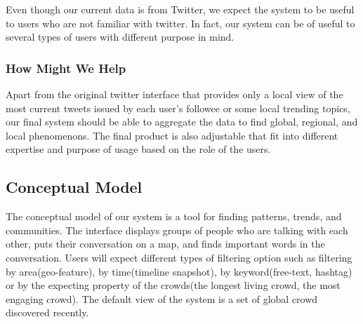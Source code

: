 \documentclass{sig-alternate}
\begin{document}
Even though our current data is from Twitter, we expect the system to be useful
to users who are not familiar with twitter. In fact, our system can be of
useful to several types of users with different purpose in mind.

\subsubsection{How Might We Help}
Apart from the original twitter interface that provides only a local view of
the most current tweets issued by each user's followee or some local trending
topics, our final system should be able to aggregate the data to find global,
regional, and local phenomenons. The final product is also adjustable that fit
into different expertise and purpose of usage based on the role of the users.

\subsection{Conceptual Model}
The conceptual model of our system is a tool for finding patterns, trends, and
communities. The interface displays groups of people who are talking with each
other, puts their conversation on a map, and finds important words in the
conversation. Users will expect different types of filtering option such as
filtering by area(geo-feature), by time(timeline snapshot), by
keyword(free-text, hashtag) or by the expecting property of the crowds(the
longest living crowd, the most engaging crowd). The default view of the system
is a set of global crowd discovered recently.
\end{document}
